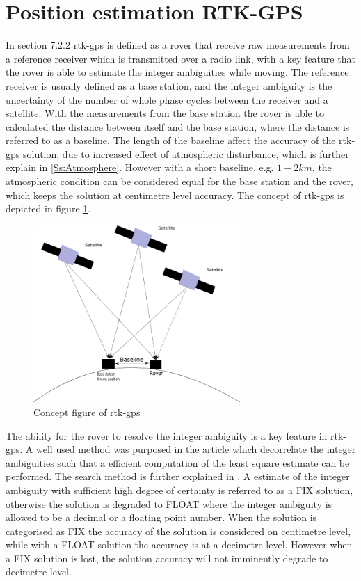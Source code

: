\section{Position estimation RTK-GPS}\label{ss:rtk-gps}
In \citep{misra2011global} section 7.2.2 \acrfull{rtk-gps} is defined as a rover that receive raw measurements from a reference receiver which is transmitted over a radio link, with a key feature that the rover is able to estimate the integer ambiguities while moving. The reference receiver is usually defined as a base station, and the integer ambiguity is the uncertainty of the number of whole phase cycles between the receiver and a satellite. With the measurements from the base station the rover is able to calculated the distance between itself and the base station, where the distance is referred to as a baseline. The length of the baseline affect the accuracy of the \gls{rtk-gps} solution, due to increased effect of atmospheric disturbance, which is further explain in \ref{Ss:Atmosphere}. However with a short baseline, e.g. $1-2 km$, the atmospheric condition can be considered equal for the base station and the rover, which keeps the solution  at centimetre level accuracy. The concept of \gls{rtk-gps} is depicted in figure \ref{figure:RTK}.
\begin{figure}[H]
	\centering
		\includegraphics[width=0.7\textwidth]{figs/DGPS.png}
		\caption{Concept figure of \acrfull{rtk-gps}}
		\label{figure:RTK}
\end{figure}
The ability for the rover to resolve the integer ambiguity is a key feature in \gls{rtk-gps}. A well used method was purposed in the article \citep{teunissen1994new} which decorrelate the integer ambiguities such that a efficient computation of the least square estimate can be performed. The search method is further explained in \citep{teunissen1995least}. A estimate of the integer ambiguity with sufficient high degree of certainty is referred to as a FIX solution, otherwise the solution is degraded to FLOAT where the integer ambiguity is allowed to be a decimal or a floating point number. When the solution is categorised as FIX the accuracy of the solution is considered on centimetre level, while with a FLOAT solution the accuracy is at a decimetre level. However when a FIX solution is lost, the solution accuracy will not imminently degrade to decimetre level.

